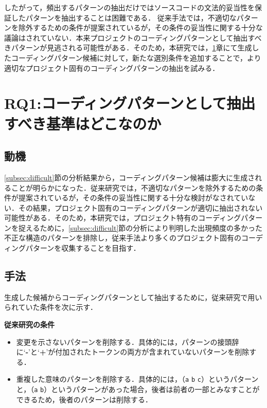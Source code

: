 \documentclass[11pt]{jreport}
\newcommand{\RQone}{コーディングパターンとして抽出すべき基準はどこなのか}
\begin{document}
したがって，頻出するパターンの抽出だけではソースコードの文法的妥当性を保証したパターンを抽出することは困難である．
従来手法では，不適切なパターンを除外するための条件が提案されているが，その条件の妥当性に関する十分な議論はされていない．本来プロジェクトのコーディングパターンとして抽出すべきパターンが見逃される可能性がある．そのため，本研究では，\ref{sec:filter}章にて生成したコーディングパターン候補に対して，新たな選別条件を追加することで，より適切なプロジェクト固有のコーディングパターンの抽出を試みる．


\chapter{RQ1:\RQone}\label{sec:filter}
\section{動機}
\ref{subsec:difficult}節の分析結果から，コーディングパターン候補は膨大に生成されることが明らかになった．従来研究では，不適切なパターンを除外するための条件が提案されているが，その条件の妥当性に関する十分な検討がなされていない．その結果，プロジェクト固有のコーディングパターンが適切に抽出されない可能性がある．そのため，本研究では，プロジェクト特有のコーディングパターンを捉えるために，\ref{subsec:difficult}節の分析により判明した出現頻度の多かった不正な構造のパターンを排除し，従来手法より多くのプロジェクト固有のコーディングパターンを収集することを目指す．

\section{手法}
生成した候補からコーディングパターンとして抽出するために，従来研究で用いられていた条件を次に示す．

\textbf{従来研究の条件}
\begin{itemize}
    \item 変更を示さないパターンを削除する．具体的には，パターンの接頭辞に`\textbf{-}'と`\textbf{+}'が付加されたトークンの両方が含まれていないパターンを削除する．
    \item 重複した意味のパターンを削除する．具体的には，（\colorbox{lightgray!50}{\texttt{a}} \colorbox{lightgray!50}{\texttt{b}} \colorbox{lightgray!50}{\texttt{c}}）というパターンと，（\colorbox{lightgray!50}{\texttt{a}} \colorbox{lightgray!50}{\texttt{b}}）というパターンがあった場合，後者は前者の一部とみなすことができるため，後者のパターンは削除する．
\end{itemize}
\end{document}
